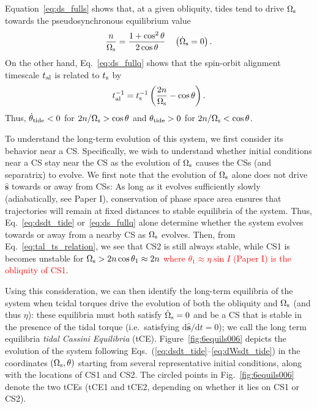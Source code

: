 \documentclass[
        fleqn,
        usenatbib,
        referee
    ]{mnras}
\newcommand*{\rdil}[2]{\mathrm{d}#1/\mathrm{d}#2}
\newcommand*{\p}[1]{\left(#1\right)}
\newcommand*{\uv}[1]{\hat{\boldsymbol{\mathbf{#1}}}}
\begin{document}
Equation~\eqref{eq:ds_fulls} shows that, at a given obliquity, tides tend to
drive $\Omega_{\rm s}$ towards the pseudosynchronous equilibrium value
\begin{equation}
     \frac{n}{\Omega_{\rm s}}
        = \frac{1 + \cos^2\theta}{2\cos \theta} \quad
        \p{\dot{\Omega}_{\rm s} = 0}.\label{eq:weaktide_dWszero}
\end{equation}
On the other hand, Eq.~\eqref{eq:ds_fullq} shows that the spin-orbit alignment
timescale $t_{\rm al}$ is related to $t_{\rm s}$ by
\begin{equation}
    t_{\rm al}^{-1} = t_{\rm s}^{-1}\p{\frac{2n}{\Omega_{\rm s}} - \cos \theta}.
        \label{eq:tal_ts_relation}
\end{equation}
Thus, $\dot{\theta}_{\rm tide} < 0$ for $2n / \Omega_{\rm s} > \cos \theta$ and
$\theta_{\rm tide} > 0$ for $2n / \Omega_{\rm s} < \cos \theta$.

To understand the long-term evolution of this system, we first consider its
behavior near a CS\@. Specifically, we wish to understand whether initial
conditions near a CS stay near the CS as the evolution of $\Omega_{\rm s}$
causes the CSs (and separatrix) to evolve. We first note that the evolution of
$\Omega_{\rm s}$ alone does not drive $\uv{s}$ towards or away from CSs: As long
as it evolves sufficiently slowly (adiabatically, see Paper I), conservation of
phase space area ensures that trajectories will remain at fixed distances to
stable equilibria of the system. Thus, Eq.~\eqref{eq:dsdt_tide}
or~\eqref{eq:ds_fullq} alone determine whether the system evolves towards or
away from a nearby CS as $\Omega_{\rm s}$ evolves. Then, from
Eq.~\eqref{eq:tal_ts_relation}, we see that CS2 is still always stable, while
CS1 is becomes unstable for \textcolor{red}{$\Omega_{\rm s} > 2n \cos \theta_1
\approx 2n$ where $\theta_1 \approx \eta \sin I$ (Paper I) is the obliquity of
CS1}.

Using this consideration, we can then identify the long-term equilibria of the
system when tcidal torques drive the evolution of both the obliquity and
$\Omega_{\rm s}$ (and thus $\eta$): these equilibria must both satisfy
$\dot{\Omega}_{\rm s} = 0$ and be a CS that is stable in the presence of the
tidal torque (i.e.\ satisfying $\rdil{\uv{s}}{t} = 0$); we call the long term
equilibria \emph{tidal Cassini Equilibria} (tCE). Figure~\ref{fig:6equils006}
depicts the evolution of the system following
Eqs.~(\ref{eq:dsdt_tide}--\ref{eq:dWsdt_tide}) in the coordinates $(\Omega_{\rm
s}, \theta)$ starting from several representative initial conditions, along with
the locations of CS1 and CS2. The circled points in Fig.~\ref{fig:6equils006}
denote the two tCEs (tCE1 and tCE2, depending on whether it lies on CS1 or CS2).
\end{document}
